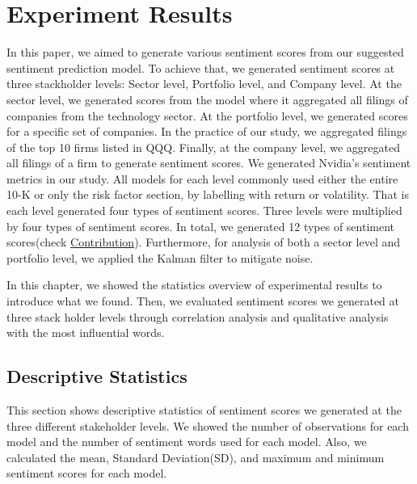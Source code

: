 \documentclass[logo,bsc,singlespacing,parskip]{infthesis}
\begin{document}
\chapter{Experiment Results}
In this paper, we aimed to generate various sentiment scores from our suggested sentiment prediction model. To achieve that, we generated sentiment scores at three stackholder levels: Sector level, Portfolio level, and Company level. At the sector level, we generated scores from the model where it aggregated all filings of companies from the technology sector. At the portfolio level, we generated scores for a specific set of companies. In the practice of our study, we aggregated filings of the top 10 firms listed in QQQ. Finally, at the company level, we aggregated all filings of a firm to generate sentiment scores. We generated Nvidia’s sentiment metrics in our study. All models for each level commonly used either the entire 10-K or only the risk factor section, by labelling with return or volatility. That is each level generated four types of sentiment scores. Three levels were multiplied by four types of sentiment scores. In total, we generated 12 types of sentiment scores(check \hyperref[sec:contribution]{Contribution}). Furthermore, for analysis of both a sector level and portfolio level, we applied the Kalman filter to mitigate noise.

In this chapter, we showed the statistics overview of experimental results to introduce what we found. Then, we evaluated sentiment scores we generated at three stack holder levels through correlation analysis and qualitative analysis with the most influential words. 

\section{Descriptive Statistics}
This section shows descriptive statistics of sentiment scores we generated at the three different stakeholder levels. We showed the number of observations for each model and the number of sentiment words used for each model. Also, we calculated the mean, Standard Deviation(SD), and maximum and minimum sentiment scores for each model.
\end{document}
